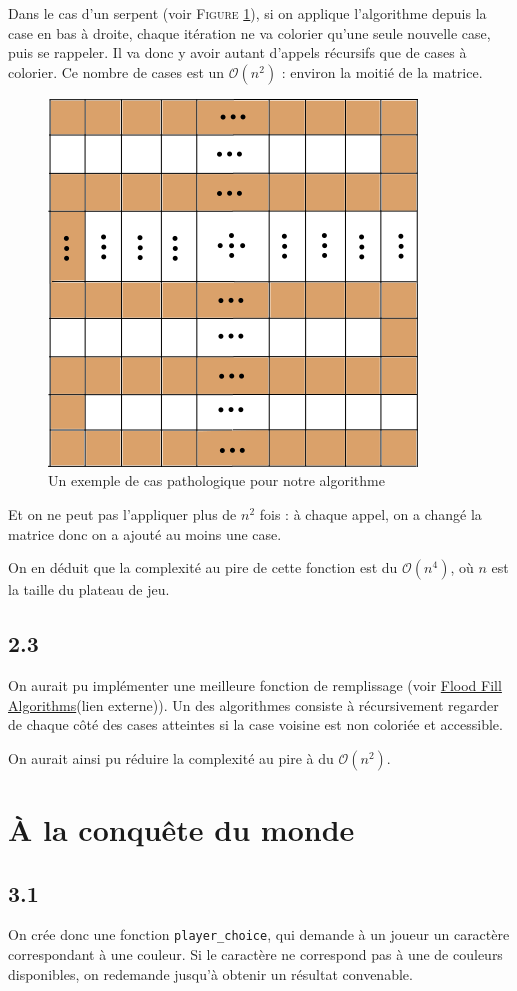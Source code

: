 \documentclass[12pt]{article}
\def\question#1{\subsection{#1}}
\def\sec#1{\section{#1}}
\begin{document}
Dans le cas d'un serpent (voir \textsc{Figure }\ref{serpent}), si on applique l'algorithme depuis la case en bas à droite, chaque itération ne va colorier qu'une seule nouvelle case, puis se rappeler. Il va donc y avoir autant d'appels récursifs que de cases à colorier. Ce nombre de cases est un $\mathcal{O}(n^2)$ : environ la moitié de la matrice.

\begin{figure}
\center
\includegraphics[scale = 0.6]{serpent.png}
\caption{Un exemple de cas pathologique pour notre algorithme}
\label{serpent}
\end{figure}

Et on ne peut pas l'appliquer plus de $n^2$ fois : à chaque appel, on a changé la matrice donc on a ajouté au moins une case.

On en déduit que la complexité au pire de cette fonction est du $\mathcal{O}(n^4)$, où $n$ est la taille du plateau de jeu.


\question{2.3}

On aurait pu implémenter une meilleure fonction de remplissage (voir \href{https://en.wikipedia.org/wiki/Flood_fill}{Flood Fill Algorithms}(lien externe)). Un des algorithmes consiste à récursivement regarder de chaque côté des cases atteintes si la case voisine est non coloriée et accessible.

On aurait ainsi pu réduire la complexité au pire à du $\mathcal{O}(n^2)$.


\sec{À la conquête du monde}
\question{3.1}
On crée donc une fonction \texttt{player\_choice}, qui demande à un joueur un caractère correspondant à une couleur. Si le caractère ne correspond pas à une de couleurs disponibles, on redemande jusqu'à obtenir un résultat convenable.
\end{document}
